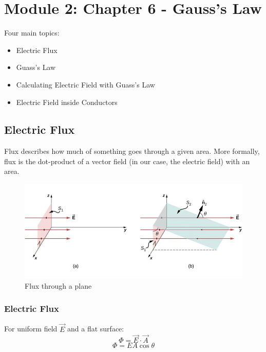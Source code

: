 \documentclass[14pt]{memoir}
\begin{document}
\chapter{Module 2: Chapter 6 - Gauss's Law}

Four main topics:

\begin{itemize}
\item Electric Flux
\item Guass's Law
\item Calculating Electric Field with Guass's Law
\item Electric Field inside Conductors
\end{itemize}


\section{Electric Flux}

Flux describes how much of something goes through a given area. More formally, flux is the dot-product of a vector field (in our case, the electric field) with an area.  

\begin{figure}[h]
\begin{center}
\includegraphics[scale=0.60]{fig/fig_06_04.jpg}
\caption{Flux through a plane}
\label{fig:06_04}
\end{center}
\end{figure}

\subsection{Electric Flux}

For uniform field $\vec{E}$ and a flat surface:
\begin{equation}
\Phi = \vec{E} \cdot \vec{A}
\end{equation}
\begin{equation}
\Phi = E A \cos{\theta}
\end{equation}
\end{document}
